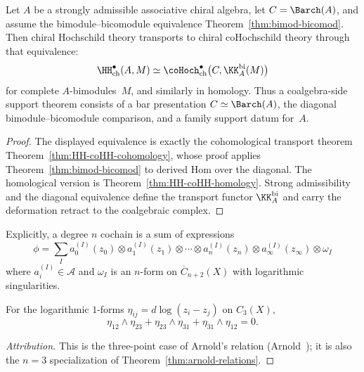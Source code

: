 \begin{proposition}
\label{prop:cohochschild-transport-scope-theorem-h}
Let $A$ be a strongly admissible associative chiral algebra, let
$C=\Barch(A)$, and assume the bimodule--bicomodule equivalence
Theorem~\ref{thm:bimod-bicomod}. Then chiral Hochschild theory
transports to chiral coHochschild theory through that equivalence:
\[
\HH_{\mathrm{ch}}^\bullet(A,M)
\simeq
\coHoch_{\mathrm{ch}}^\bullet
\bigl(C,\KK_A^{\mathrm{bi}}(M)\bigr)
\]
for complete $A$-bimodules~$M$, and similarly in homology.  Thus a
coalgebra-side support theorem consists of a bar presentation
$C\simeq\Barch(A)$, the diagonal bimodule--bicomodule comparison, and
a family support datum for~$A$.
\end{proposition}

\begin{proof}
The displayed equivalence is exactly the cohomological transport
theorem
Theorem~\ref{thm:HH-coHH-cohomology}, whose proof applies
Theorem~\ref{thm:bimod-bicomod} to derived Hom over the diagonal.
The homological version is Theorem~\ref{thm:HH-coHH-homology}.  Strong
admissibility and the diagonal equivalence define the transport
functor $\KK_A^{\mathrm{bi}}$ and carry the deformation retract to the
coalgebraic complex.
\end{proof}

Explicitly, a degree $n$ cochain is a sum of expressions
\[
\phi = \sum_I a_0^{(I)}(z_0) \otimes a_1^{(I)}(z_1) \otimes \cdots \otimes a_n^{(I)}(z_n) \otimes a_{\infty}^{(I)}(z_{\infty}) \otimes \omega_I
\]
where $a_i^{(I)} \in \mathcal{A}$ and $\omega_I$ is an $n$-form on $\overline{C}_{n+2}(X)$ with logarithmic singularities.

\begin{lemma}
\label{lem:arnold-three-point-hochschild}
For the logarithmic $1$-forms
$\eta_{ij}=d\log(z_i-z_j)$ on $C_3(X)$,
\begin{equation}\label{eq:arnold-three-point}
\eta_{12} \wedge \eta_{23}
+ \eta_{23} \wedge \eta_{31}
+ \eta_{31} \wedge \eta_{12} = 0.
\end{equation}
\end{lemma}

\begin{proof}[Attribution]
This is the three-point case of Arnold's relation
(Arnold~\cite{Arnold69}); it is also the $n=3$ specialization of
Theorem~\ref{thm:arnold-relations}.
\end{proof}


